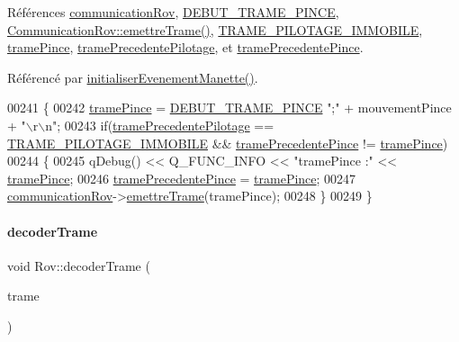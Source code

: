 Références \hyperlink{rov_8h_source_l00097}{communication\+Rov}, \hyperlink{rov_8h_source_l00052}{D\+E\+B\+U\+T\+\_\+\+T\+R\+A\+M\+E\+\_\+\+P\+I\+N\+CE}, \hyperlink{communicationrov_8cpp_source_l00060}{Communication\+Rov\+::emettre\+Trame()}, \hyperlink{rov_8h_source_l00058}{T\+R\+A\+M\+E\+\_\+\+P\+I\+L\+O\+T\+A\+G\+E\+\_\+\+I\+M\+M\+O\+B\+I\+LE}, \hyperlink{rov_8h_source_l00105}{trame\+Pince}, \hyperlink{rov_8h_source_l00103}{trame\+Precedente\+Pilotage}, et \hyperlink{rov_8h_source_l00106}{trame\+Precedente\+Pince}.



Référencé par \hyperlink{rov_8cpp_source_l00052}{initialiser\+Evenement\+Manette()}.


\begin{DoxyCode}
00241 \{
00242     \hyperlink{class_rov_a2c24d7c884d8fae07e452105037f8e2c}{tramePince} = \hyperlink{rov_8h_ab9dc0e136712ab8227078e19a43e166a}{DEBUT\_TRAME\_PINCE} \textcolor{stringliteral}{";"} + mouvementPince + \textcolor{stringliteral}{"\(\backslash\)r\(\backslash\)n"};
00243     \textcolor{keywordflow}{if}(\hyperlink{class_rov_a12b08128a49ca43fc1198fdeb6a6f0cd}{tramePrecedentePilotage} == \hyperlink{rov_8h_ab218eea9b0b6d799e400a0d1ff835c13}{TRAME\_PILOTAGE\_IMMOBILE} && 
      \hyperlink{class_rov_aa8ee68edaa542473e1e5ea6bc24432ce}{tramePrecedentePince} != \hyperlink{class_rov_a2c24d7c884d8fae07e452105037f8e2c}{tramePince})
00244     \{
00245         qDebug() << Q\_FUNC\_INFO << \textcolor{stringliteral}{"tramePince :"} << \hyperlink{class_rov_a2c24d7c884d8fae07e452105037f8e2c}{tramePince};
00246         \hyperlink{class_rov_aa8ee68edaa542473e1e5ea6bc24432ce}{tramePrecedentePince} = \hyperlink{class_rov_a2c24d7c884d8fae07e452105037f8e2c}{tramePince};
00247         \hyperlink{class_rov_a8e7aaa17ee2134f26d57241d11ab2a99}{communicationRov}->\hyperlink{class_communication_rov_a4f52076db8d6e78abe1745fa1e235272}{emettreTrame}(tramePince);
00248     \}
00249 \}
\end{DoxyCode}
\mbox{\label{class_rov_ad818ff6ee1210ae44a24106b2bbbee7d}} 
\paragraph{\texorpdfstring{decoder\+Trame}{decoderTrame}}
{\footnotesize\ttfamily void Rov\+::decoder\+Trame (\begin{DoxyParamCaption}\item[{Q\+String}]{trame }\end{DoxyParamCaption})\hspace{0.3cm}{\ttfamily [slot]}}



